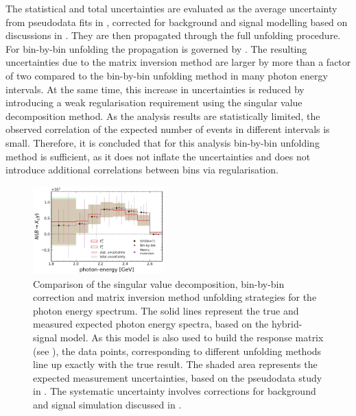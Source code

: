 The statistical and total uncertainties are evaluated as the average uncertainty from pseudodata fits in , corrected for background and signal modelling based on discussions in .
They are then propagated through the full unfolding procedure.
For bin-by-bin unfolding the propagation is governed by .
The resulting uncertainties due to the matrix inversion method are larger by more than a factor of two compared to the bin-by-bin unfolding method in many photon energy intervals.
At the same time, this increase in uncertainties is reduced by introducing a weak regularisation requirement using the singular value decomposition method.
As the analysis results are statistically limited, the observed correlation of the expected number of events in different \EB intervals is small.
Therefore, it is concluded that for this analysis bin-by-bin unfolding method is sufficient, as it does not inflate the uncertainties and does not introduce additional correlations between bins via regularisation.

\begin{figure}[hbtp!]
    \centering
    \includegraphics[width=0.45\textwidth]{figures/signal_validation/bin_by_bin_svd_comparison_cov_mtx.pdf}
    \caption{\label{fig:unfolding_comparison}
    Comparison of the singular value decomposition, bin-by-bin correction and matrix inversion method unfolding strategies
    for the photon energy spectrum.
    The solid lines represent the true and measured expected photon energy spectra, based on the hybrid-signal model.
    As this model is also used to build the response matrix (see ), the data points, corresponding to different unfolding methods 
    line up exactly with the true result.
    The shaded area represents the expected measurement uncertainties, based on the pseudodata study in .
    The systematic uncertainty involves corrections for background and signal simulation discussed in .
    }
\end{figure}

